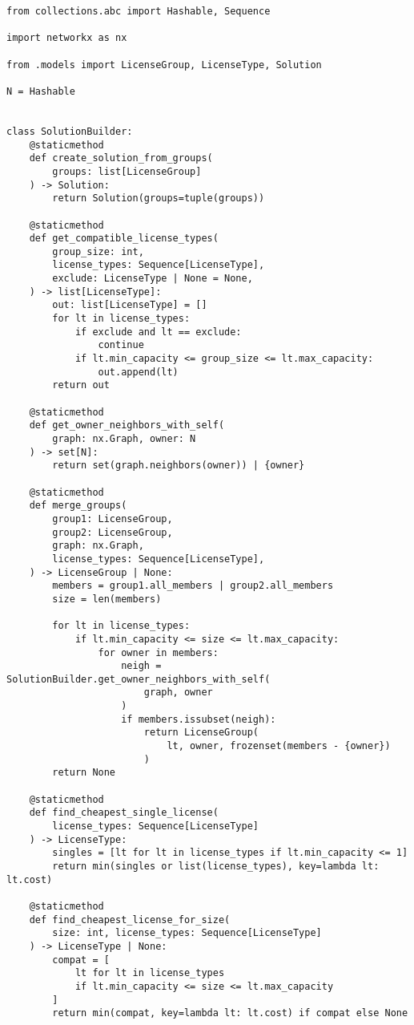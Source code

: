     {\footnotesize
        \begin{verbatim}
from collections.abc import Hashable, Sequence

import networkx as nx

from .models import LicenseGroup, LicenseType, Solution

N = Hashable


class SolutionBuilder:
    @staticmethod
    def create_solution_from_groups(
        groups: list[LicenseGroup]
    ) -> Solution:
        return Solution(groups=tuple(groups))

    @staticmethod
    def get_compatible_license_types(
        group_size: int,
        license_types: Sequence[LicenseType],
        exclude: LicenseType | None = None,
    ) -> list[LicenseType]:
        out: list[LicenseType] = []
        for lt in license_types:
            if exclude and lt == exclude:
                continue
            if lt.min_capacity <= group_size <= lt.max_capacity:
                out.append(lt)
        return out

    @staticmethod
    def get_owner_neighbors_with_self(
        graph: nx.Graph, owner: N
    ) -> set[N]:
        return set(graph.neighbors(owner)) | {owner}

    @staticmethod
    def merge_groups(
        group1: LicenseGroup,
        group2: LicenseGroup,
        graph: nx.Graph,
        license_types: Sequence[LicenseType],
    ) -> LicenseGroup | None:
        members = group1.all_members | group2.all_members
        size = len(members)

        for lt in license_types:
            if lt.min_capacity <= size <= lt.max_capacity:
                for owner in members:
                    neigh = SolutionBuilder.get_owner_neighbors_with_self(
                        graph, owner
                    )
                    if members.issubset(neigh):
                        return LicenseGroup(
                            lt, owner, frozenset(members - {owner})
                        )
        return None

    @staticmethod
    def find_cheapest_single_license(
        license_types: Sequence[LicenseType]
    ) -> LicenseType:
        singles = [lt for lt in license_types if lt.min_capacity <= 1]
        return min(singles or list(license_types), key=lambda lt: lt.cost)

    @staticmethod
    def find_cheapest_license_for_size(
        size: int, license_types: Sequence[LicenseType]
    ) -> LicenseType | None:
        compat = [
            lt for lt in license_types
            if lt.min_capacity <= size <= lt.max_capacity
        ]
        return min(compat, key=lambda lt: lt.cost) if compat else None
\end{verbatim}
    }

